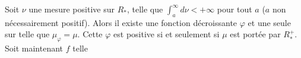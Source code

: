Soit \(\nu\) une mesure positive sur \(R_*\), telle que \(\int_a^\infty d\nu<+\infty\) pour tout \(a\) (\(a\) non nécessairement positif).  Alors il existe une fonction décroissante \(\varphi\) et une seule sur \inserted{\(R_*^+\) (resp. \deleted{\(]0,M[\)} sur \(]0,M[\))} telle que \(\mu_\varphi=\mu\). Cette \(\varphi\) est positive si et seulement si \(\mu\) est portée par \(R_*^+\).  Soit maintenant \(f\) telle


